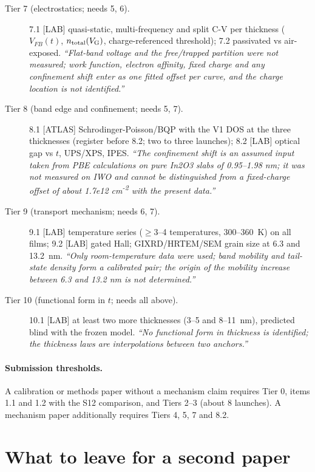 \begin{description}
  \item[Tier 7 (electrostatics; needs 5, 6).] 7.1 [LAB] quasi-static, multi-frequency and split C-V per thickness ($V_{FB}(t)$, $n_{\mathrm{total}}(V_{\mathrm{G}})$, charge-referenced threshold); 7.2 passivated vs air-exposed. \emph{``Flat-band voltage and the free/trapped partition were not measured; work function, electron affinity, fixed charge and any confinement shift enter as one fitted offset per curve, and the charge location is not identified.''}
  \item[Tier 8 (band edge and confinement; needs 5, 7).] 8.1 [ATLAS] Schrodinger-Poisson/BQP with the V1 DOS at the three thicknesses (register before 8.2; two to three launches); 8.2 [LAB] optical gap vs $t$, UPS/XPS, IPES. \emph{``The confinement shift is an assumed input taken from PBE calculations on pure In2O3 slabs of 0.95--1.98 nm; it was not measured on IWO and cannot be distinguished from a fixed-charge offset of about 1.7e12 cm\textsuperscript{-2} with the present data.''}
  \item[Tier 9 (transport mechanism; needs 6, 7).] 9.1 [LAB] temperature series ($\ge$3--4 temperatures, 300--360~K) on all films; 9.2 [LAB] gated Hall; GIXRD/HRTEM/SEM grain size at 6.3 and 13.2~nm. \emph{``Only room-temperature data were used; band mobility and tail-state density form a calibrated pair; the origin of the mobility increase between 6.3 and 13.2 nm is not determined.''}
  \item[Tier 10 (functional form in $t$; needs all above).] 10.1 [LAB] at least two more thicknesses (3--5 and 8--11~nm), predicted blind with the frozen model. \emph{``No functional form in thickness is identified; the thickness laws are interpolations between two anchors.''}
\end{description}

\paragraph{Submission thresholds.} A calibration or methods paper without a mechanism claim requires Tier 0, items 1.1 and 1.2 with the S12 comparison, and Tiers 2--3 (about 8 launches). A mechanism paper additionally requires Tiers 4, 5, 7 and 8.2.

\section{What to leave for a second paper}\label{sec:val-second-paper}

